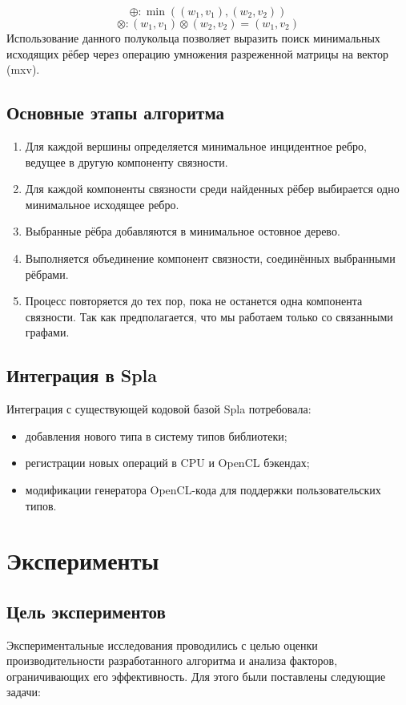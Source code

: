 \documentclass[a4paper]{article}
\begin{document}
\[ \oplus : \min((w_1, v_1), (w_2, v_2)) \]
\[\otimes : (w_1, v_1) \otimes (w_2, v_2) = (w_1, v_2)\]
Использование данного полукольца позволяет выразить поиск минимальных исходящих рёбер через операцию умножения разреженной матрицы на вектор (mxv).
\subsection{Основные этапы алгоритма}
\begin{enumerate}
    \item Для каждой вершины определяется минимальное инцидентное ребро, ведущее в другую компоненту связности.
    \item Для каждой компоненты связности среди найденных рёбер выбирается одно минимальное исходящее ребро.
    \item Выбранные рёбра добавляются в минимальное остовное дерево.
    \item Выполняется объединение компонент связности, соединённых выбранными рёбрами.
    \item Процесс повторяется до тех пор, пока не останется одна компонента связности. Так как предполагается, что мы работаем только со связанными графами.
\end{enumerate}
\subsection{Интеграция в Spla}

Интеграция с существующей кодовой базой Spla потребовала:
\begin{itemize}
    \item добавления нового типа в систему типов библиотеки;
    \item регистрации новых операций в CPU и OpenCL бэкендах;
    \item модификации генератора OpenCL-кода для поддержки пользовательских типов.
\end{itemize}

\section{Эксперименты}
\subsection{Цель экспериментов}

Экспериментальные исследования проводились с целью оценки производительности разработанного алгоритма и анализа факторов, ограничивающих его эффективность. Для этого были поставлены следующие задачи:
\end{document}
